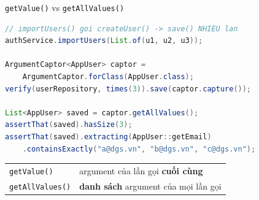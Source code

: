\documentclass[aspectratio=169,12pt]{beamer}
\begin{document}
\begin{frame}[fragile]{\texttt{getValue()} vs \texttt{getAllValues()}}
\begin{lstlisting}[language=java,basicstyle=\ttfamily\footnotesize]
// importUsers() goi createUser() -> save() NHIEU lan
authService.importUsers(List.of(u1, u2, u3));

ArgumentCaptor<AppUser> captor =
    ArgumentCaptor.forClass(AppUser.class);
verify(userRepository, times(3)).save(captor.capture());

List<AppUser> saved = captor.getAllValues();
assertThat(saved).hasSize(3);
assertThat(saved).extracting(AppUser::getEmail)
    .containsExactly("a@dgs.vn", "b@dgs.vn", "c@dgs.vn");
\end{lstlisting}

  \begin{center}
  \small
  \begin{tabular}{ll}
    \toprule
    \texttt{getValue()} & argument của lần gọi \textbf{cuối cùng} \\
    \texttt{getAllValues()} & \textbf{danh sách} argument của mọi lần gọi \\
    \bottomrule
  \end{tabular}
  \end{center}
\end{frame}
\end{document}
